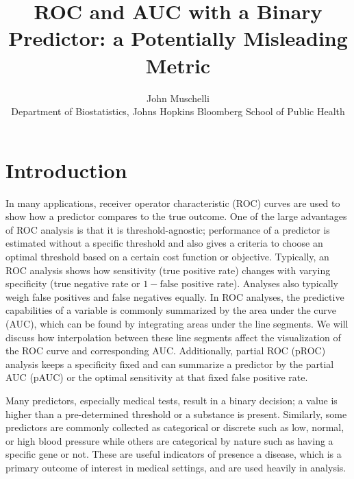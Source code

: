 \documentclass[article]{jss}
\author{
John Muschelli\\Department of Biostatistics, Johns Hopkins Bloomberg School of Public
Health
}
\title{ROC and AUC with a Binary Predictor: a Potentially Misleading Metric}
\begin{document}
\hypertarget{introduction}{%
\section{Introduction}\label{introduction}}

In many applications, receiver operator characteristic (ROC) curves are
used to show how a predictor compares to the true outcome. One of the
large advantages of ROC analysis is that it is threshold-agnostic;
performance of a predictor is estimated without a specific threshold and
also gives a criteria to choose an optimal threshold based on a certain
cost function or objective. Typically, an ROC analysis shows how
sensitivity (true positive rate) changes with varying specificity (true
negative rate or \(1 - \text{false positive rate}\)). Analyses also
typically weigh false positives and false negatives equally. In ROC
analyses, the predictive capabilities of a variable is commonly
summarized by the area under the curve (AUC), which can be found by
integrating areas under the line segments. We will discuss how
interpolation between these line segments affect the visualization of
the ROC curve and corresponding AUC. Additionally, partial ROC (pROC)
analysis keeps a specificity fixed and can summarize a predictor by the
partial AUC (pAUC) or the optimal sensitivity at that fixed false
positive rate.

Many predictors, especially medical tests, result in a binary decision;
a value is higher than a pre-determined threshold or a substance is
present. Similarly, some predictors are commonly collected as
categorical or discrete such as low, normal, or high blood pressure
while others are categorical by nature such as having a specific gene or
not. These are useful indicators of presence a disease, which is a
primary outcome of interest in medical settings, and are used heavily in
analysis.
\end{document}

